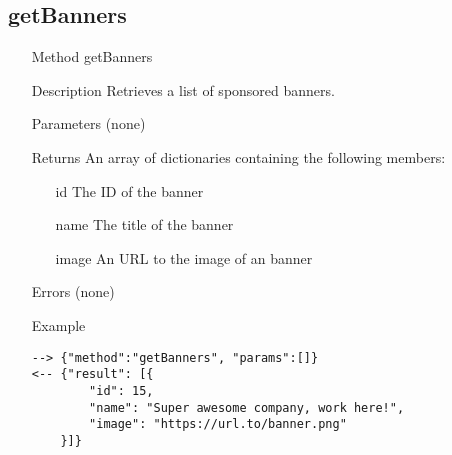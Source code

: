 \documentclass[a4paper]{scrreprt}
\begin{document}
\subsection{getBanners}
\begin{enumerate}
\item[Method] getBanners
\item[Description] Retrieves a list of sponsored banners.
\item[Parameters] (none)
\item[Returns] An array of dictionaries containing the following members:
\begin{enumerate}
    \item[id] The ID of the banner
    \item[name] The title of the banner
	\item[image] An URL to the image of an banner
	\end{enumerate}
\item[Errors] (none)
\item[Example]
\begin{lstlisting}
--> {"method":"getBanners", "params":[]}
<-- {"result": [{
        "id": 15, 
        "name": "Super awesome company, work here!", 
        "image": "https://url.to/banner.png"
    }]}
\end{lstlisting}
\end{enumerate}
\end{document}
